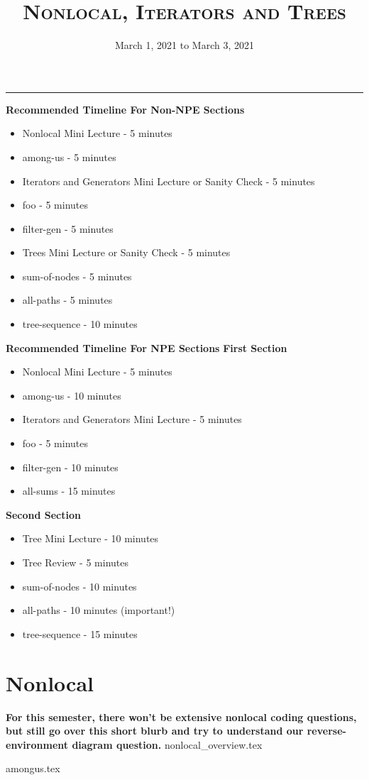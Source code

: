 \documentclass{exam}
\title{\textsc{Nonlocal, Iterators and Trees}}
\date{March 1, 2021 to March 3, 2021}
\begin{document}
	\maketitle
	\rule{\textwidth}{0.15em}
	\fontsize{12}{15}\selectfont

\begin{guide}
	\textbf{Recommended Timeline For Non-NPE Sections}
	\begin{itemize}
		\item Nonlocal Mini Lecture - 5 minutes
		\item among-us - 5 minutes
		\item Iterators and Generators Mini Lecture or Sanity Check - 5 minutes
		\item foo - 5 minutes
		\item filter-gen - 5 minutes
		\item Trees Mini Lecture or Sanity Check - 5 minutes
		\item sum-of-nodes - 5 minutes
		\item all-paths - 5 minutes
		\item tree-sequence - 10 minutes
	\end{itemize}
	\textbf{Recommended Timeline For NPE Sections}
	\textbf{First Section}
	\begin{itemize}
		\item Nonlocal Mini Lecture - 5 minutes
		\item among-us - 10 minutes
		\item Iterators and Generators Mini Lecture - 5 minutes
		\item foo - 5 minutes
		\item filter-gen - 10 minutes
		\item all-sums - 15 minutes
	\end{itemize}
	\textbf{Second Section}
	\begin{itemize}
		\item Tree Mini Lecture - 10 minutes
		\item Tree Review - 5 minutes
		\item sum-of-nodes - 10 minutes
		\item all-paths - 10 minutes (important!)
		\item tree-sequence - 15 minutes
	\end{itemize}
\end{guide}

\vspace{-1em}
\section{Nonlocal}
\textbf{For this semester, there won't be extensive nonlocal coding questions, but still go over this short blurb and try to understand our reverse-environment diagram question.}
\newline
{nonlocal_overview.tex}
\begin{questions}
	{amongus.tex}
\end{questions}
\vspace{-2em}
\newpage
\end{document}
